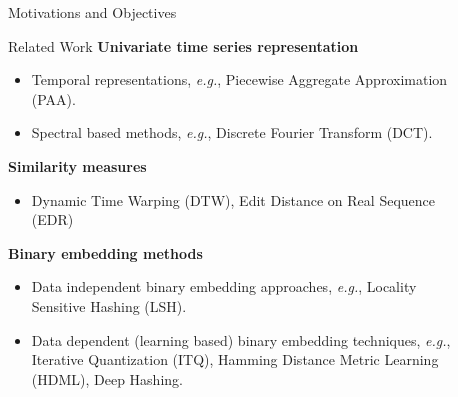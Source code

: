 \documentclass[final]{beamer}
\newlength{\sepwid}
\newlength{\onecolwid}
\newlength{\twocolwid}
\begin{document}
\begin{frame}[t]
\begin{columns}[t]
\begin{column}{\onecolwid}
\begin{alertblock}{Motivations and Objectives}
\end{alertblock}


\begin{block}{Related Work}
\textbf{Univariate time series representation}
\begin{itemize}
\item Temporal representations, \textit{e.g.}, Piecewise Aggregate Approximation (PAA).
\item Spectral based methods, \textit{e.g.},  Discrete Fourier Transform (DCT).
\end{itemize}

\textbf{Similarity measures}
\begin{itemize}
\item  Dynamic Time Warping (DTW), Edit Distance on Real Sequence (EDR)
\end{itemize}

\textbf{Binary embedding methods}
\begin{itemize}
\item  Data independent binary embedding approaches, \textit{e.g.}, Locality Sensitive Hashing (LSH).
\item  Data dependent (learning based) binary embedding techniques, \textit{e.g.}, Iterative Quantization (ITQ), Hamming Distance Metric Learning (HDML), Deep Hashing.
\end{itemize}

\end{block}




\end{column} %

\begin{column}{\sepwid}\end{column} %

\begin{column}{\twocolwid} %


\end{column}
\end{columns}
\end{frame}
\end{document}
